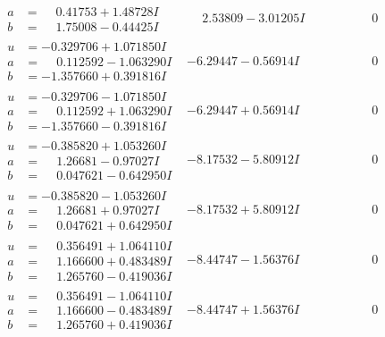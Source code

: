 \documentclass[1p]{elsarticle_modified}
\theoremstyle{definition}
\begin{document}
$$\begin{array}{c|c|c}
\begin{aligned}
a &= \phantom{-}0.41753 + 1.48728 I \\
b &= \phantom{-}1.75008 - 0.44425 I\end{aligned}
 & \phantom{-}2.53809 - 3.01205 I & \phantom{-0.000000 } 0 \\ \hline\begin{aligned}
u &= -0.329706 + 1.071850 I \\
a &= \phantom{-}0.112592 - 1.063290 I \\
b &= -1.357660 + 0.391816 I\end{aligned}
 & -6.29447 - 0.56914 I & \phantom{-0.000000 } 0 \\ \hline\begin{aligned}
u &= -0.329706 - 1.071850 I \\
a &= \phantom{-}0.112592 + 1.063290 I \\
b &= -1.357660 - 0.391816 I\end{aligned}
 & -6.29447 + 0.56914 I & \phantom{-0.000000 } 0 \\ \hline\begin{aligned}
u &= -0.385820 + 1.053260 I \\
a &= \phantom{-}1.26681 - 0.97027 I \\
b &= \phantom{-}0.047621 - 0.642950 I\end{aligned}
 & -8.17532 - 5.80912 I & \phantom{-0.000000 } 0 \\ \hline\begin{aligned}
u &= -0.385820 - 1.053260 I \\
a &= \phantom{-}1.26681 + 0.97027 I \\
b &= \phantom{-}0.047621 + 0.642950 I\end{aligned}
 & -8.17532 + 5.80912 I & \phantom{-0.000000 } 0 \\ \hline\begin{aligned}
u &= \phantom{-}0.356491 + 1.064110 I \\
a &= \phantom{-}1.166600 + 0.483489 I \\
b &= \phantom{-}1.265760 - 0.419036 I\end{aligned}
 & -8.44747 - 1.56376 I & \phantom{-0.000000 } 0 \\ \hline\begin{aligned}
u &= \phantom{-}0.356491 - 1.064110 I \\
a &= \phantom{-}1.166600 - 0.483489 I \\
b &= \phantom{-}1.265760 + 0.419036 I\end{aligned}
 & -8.44747 + 1.56376 I & \phantom{-0.000000 } 0\\

\end{array}$$
\end{document}
